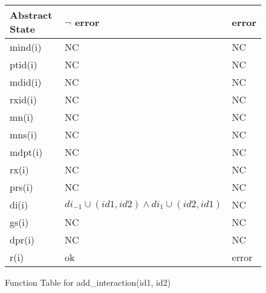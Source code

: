 \begin{figure}[!htp]
\begin{center}
\begin{tabular}{|l|l|l|}
\hline
Abstract State & $\neg$ error & error \\ \hline
mind(i)        &   NC        & NC    \\ \hline
ptid(i)        &     NC      & NC    \\ \hline
mdid(i)        &   NC       & NC    \\ \hline
rxid(i)        &     NC      & NC    \\ \hline
mn(i)          &    NC       & NC    \\ \hline
mns(i)         &   NC        & NC    \\ \hline
mdpt(i)        &   NC        & NC    \\ \hline
rx(i)          &      NC     & NC    \\ \hline
prs(i)         &     NC      & NC    \\ \hline
di(i)          &      $di_{-1} \cup (id1, id2) \wedge di_{1} \cup (id2, id1) $     & NC    \\ \hline
gs(i)          &     NC      & NC    \\ \hline
dpr(i)         &     NC      & NC    \\ \hline
r(i)           & ok        & error \\ \hline
\end{tabular}
\caption{Function Table for add\_interaction(id1, id2)}
\label{ft-ai}
\end{center}
\end{figure}

\newpage